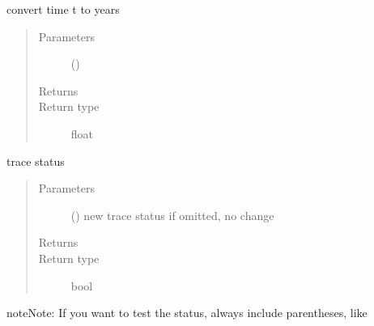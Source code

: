 \documentclass[letterpaper,10pt,english]{sphinxmanual}
\begin{document}
\begin{fulllineitems}
\begin{fulllineitems}
\end{fulllineitems}


\begin{fulllineitems}
\label{\detokenize{Reference:salabim.Environment.to_years}}
convert time t to years
\begin{quote}\begin{description}
\item[{Parameters}] \leavevmode
{} () \textendash{} 

\item[{Returns}] \leavevmode
{}

\item[{Return type}] \leavevmode
float

\end{description}\end{quote}

\end{fulllineitems}


\begin{fulllineitems}
\label{\detokenize{Reference:salabim.Environment.trace}}
trace status
\begin{quote}\begin{description}
\item[{Parameters}] \leavevmode
{} () \textendash{} new trace status 
if omitted, no change

\item[{Returns}] \leavevmode
{}

\item[{Return type}] \leavevmode
bool

\end{description}\end{quote}

\begin{sphinxadmonition}{note}{Note:}
If you want to test the status, always include
parentheses, like
\begin{quote}


\end{quote}
\end{sphinxadmonition}
\end{fulllineitems}
\end{fulllineitems}
\end{document}

